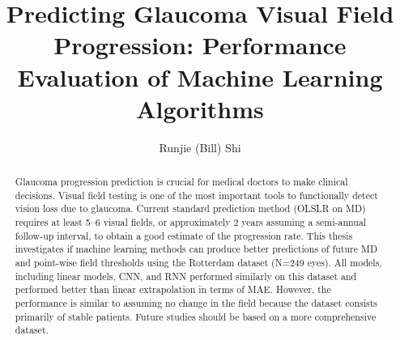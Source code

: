 \documentclass[onehalfspaced, 12pt, normalmargins]{ut-thesis}
\author{Runjie (Bill) Shi}
\title{Predicting Glaucoma Visual Field Progression: Performance Evaluation of Machine Learning Algorithms}
\begin{document}
	
\newcommand{\vf}{\textrm{VF}}
\newcommand{\md}{\textrm{MD}}
\newcommand{\iop}{\textrm{IOP}}

\begin{preliminary}

\makecover
\addtocounter{page}{-1}
\maketitle
\addtocounter{page}{-1}


\begin{abstract}
Glaucoma progression prediction is crucial for medical doctors to make clinical decisions. Visual field testing is one of the most important tools to functionally detect vision loss due to glaucoma. Current standard prediction method (\ac{OLSLR} on \ac{MD}) requires at least 5--6 visual fields, or approximately 2 years assuming a semi-annual follow-up interval, to obtain a good estimate of the progression rate. This thesis investigates if machine learning methods can produce better predictions of future \ac{MD} and point-wise field thresholds using the Rotterdam dataset (N=249 eyes). All models, including linear models, \ac{CNN}, and \ac{RNN} performed similarly on this dataset and performed better than linear extrapolation in terms of \ac{MAE}. However, the performance is similar to assuming no change in the field because the dataset consists primarily of stable patients. Future studies should be based on a more comprehensive dataset. 

\end{abstract}



\end{preliminary}
\end{document}
